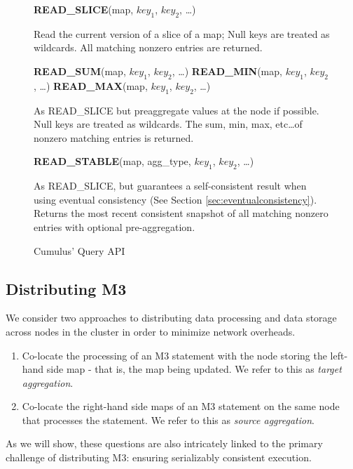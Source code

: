 \documentclass{vldb}
\begin{document}
\begin{figure}
\begin{algorithmic}
\STATE \textbf{READ\_SLICE}(map, $key_1$, $key_2$, \ldots) 
\end{algorithmic}
\hspace*{0.2in}\parbox[b]{3in}{Read the current version of a slice of a map; Null keys are treated as wildcards. All matching nonzero entries are returned.}
\begin{algorithmic}
\STATE \textbf{READ\_SUM}(map, $key_1$, $key_2$, \ldots)
\STATE \textbf{READ\_MIN}(map, $key_1$, $key_2$, \ldots)
\STATE \textbf{READ\_MAX}(map, $key_1$, $key_2$, \ldots)
\end{algorithmic}
\hspace*{0.2in}\parbox[b]{3in}{As READ\_SLICE but preaggregate values at the node if possible.  Null keys are treated as wildcards. The sum, min, max, etc\ldots of nonzero matching entries is returned.}
\begin{algorithmic}
\STATE \textbf{READ\_STABLE}(map, agg\_type, $key_1$, $key_2$, \ldots)
\end{algorithmic}
\hspace*{0.2in}\parbox[b]{3in}{As READ\_SLICE, but guarantees a self-consistent result when using eventual consistency (See Section \ref{sec:eventualconsistency}).  Returns the most recent consistent snapshot of all matching nonzero entries with optional pre-aggregation.}
\caption{Cumulus' Query API}
\label{fig:queryapi}
\end{figure}

\subsection{Distributing M3}
We consider two approaches to distributing data processing and data storage across nodes in the cluster in order to minimize network overheads.  
\begin{enumerate}
\item Co-locate the processing of an M3 statement with the node storing the left-hand side map - that is, the map being updated. We refer to this as \textit{target aggregation}.
\item Co-locate the right-hand side maps of an M3 statement on the same node that processes the statement.  We refer to this as \textit{source aggregation}.
\end{enumerate}
As we will show, these questions are also intricately linked to the primary challenge of distributing M3: ensuring serializably consistent execution. 
\end{document}
